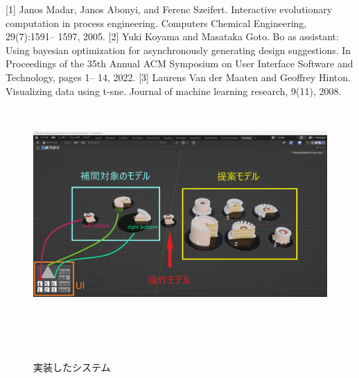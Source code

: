\documentclass[a4j,11pt]{article}
\makeatletter
\newcommand{\figcaption}[1]{\def\@captype{figure}\caption{#1}}
\makeatother
\begin{document}
\noindent{\bf [Reference]}
\indent \small{[1] Janos Madar, Janos Abonyi, and Ferenc Szeifert. Interactive evolutionary computation in process engineering. Computers Chemical Engineering, 29(7):1591–
1597, 2005.  [2] Yuki Koyama and Masataka Goto. Bo as assistant: Using bayesian optimization
for asynchronously generating design suggestions. In Proceedings of the 35th
Annual ACM Symposium on User Interface Software and Technology, pages 1–
14, 2022.  [3] Laurens Van der Maaten and Geoffrey Hinton. Visualizing data using t-sne.
Journal of machine learning research, 9(11), 2008.


\vspace{3mm}
\begin{figure}[h]
 \begin{minipage}{1\hsize}
\vspace{-8mm}
  \centering
  \includegraphics[width=0.8\hsize]{imgs/system_ano.png}
  \figcaption{\small 実装したシステム}
  \label{system}
\end{minipage}\\ \\


\end{figure}}
\end{document}
